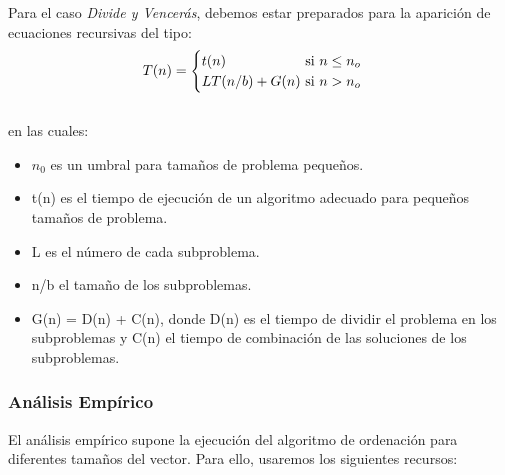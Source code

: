 \documentclass[a4paper,12pt,twoside]{article} %
\begin{document}
\vspace{1cm}


Para el caso \textit{Divide y Vencerás}, debemos estar preparados para la aparición de ecuaciones recursivas del tipo:\\

$$T(n) = \begin{cases} t(n) \hfill \text{si } n \leq n_o \cr LT(n/b) + G(n) \ \hfill \text{si } n > n_o \end{cases}$$\\

en las cuales:\\

\begin{itemize}

	\item $n_0$ es un umbral para tamaños de problema pequeños.
	\item t(n) es el tiempo de ejecución de un algoritmo adecuado para pequeños tamaños de problema.
	\item L es el número de cada subproblema.
	\item n/b el tamaño de los subproblemas.
	\item G(n) = D(n) + C(n), donde D(n) es el tiempo de dividir el problema en los subproblemas y C(n) el tiempo de combinación de las soluciones de los subproblemas.
\end{itemize}

\newpage
\subsubsection{Análisis Empírico}

El análisis empírico supone la ejecución del algoritmo de ordenación para diferentes tamaños del vector. Para ello, usaremos los siguientes recursos:\\
\end{document}
